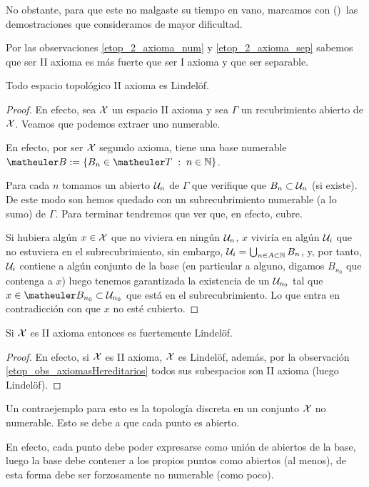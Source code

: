 No obstante, para que este no malgaste su tiempo en vano, marcamos con (\Lightning)\ las demostraciones que consideramos de mayor dificultad.
\begin{obs}
	Por las observaciones \ref{etop_2_axioma_num} y \ref{etop_2_axioma_sep} sabemos que ser II axioma es más fuerte que ser I axioma y que ser separable. 
\end{obs}
\begin{theo}
	Todo espacio topológico II axioma es Lindelöf.
\end{theo}
\begin{proof}
	En efecto, sea $\mathcal{X}$ un espacio II axioma y sea $\Gamma$ un recubrimiento abierto de $\mathcal{X}$. Veamos que podemos extraer uno numerable.
	
	En efecto, por ser $\mathcal{X}$ segundo axioma, tiene una base numerable $\B:=\{B_n\in\T\midc n\in\N\}$.
	
	Para cada $n$ tomamos un abierto $\mathcal{U}_n$ de $\Gamma$ que verifique que $B_n\subset \mathcal{U}_n$ (si existe). De este modo son hemos quedado con un subrecubrimiento numerable (a lo sumo) de $\Gamma$. Para terminar tendremos que ver que, en efecto, cubre.
	
	Si hubiera algún $x\in\mathcal{X}$ que no viviera en ningún $\mathcal{U}_n$, $x$ viviría en algún $\mathcal{U}_i$ que no estuviera en el subrecubrimiento, sin embargo, $\mathcal{U}_i=\bigcup_{n\in A\subset\mathbb{N}} B_n$, y, por tanto, $\mathcal{U}_i$ contiene a algún conjunto de la base (en particular a alguno, digamos $B_{n_0}$ que contenga a $x$) luego tenemos garantizada la existencia de un $\mathcal{U}_{n_0}$ tal que  $x\in\B_{n_0}\subset\U_{n_0}$ que está en el subrecubrimiento. Lo que entra en contradicción con que $x$ no esté cubierto.
\end{proof}
\begin{lem}
	Si $\mathcal{X}$ es II axioma entonces es fuertemente Lindelöf.
\end{lem}
\begin{proof}
	En efecto, si $\mathcal{X}$ es II axioma, $\mathcal{X}$ es Lindelöf, además, por la observación \ref{etop_obs_axiomasHereditarios} todos sus subespacios son II axioma (luego Lindelöf).
\end{proof}
\begin{obs}
	Un contraejemplo para esto es la topología discreta en un conjunto $\mathcal{X}$ no numerable. Esto se debe a que cada punto es abierto.
	
	En efecto, cada punto debe poder expresarse como unión de abiertos de la base, luego la base debe contener a los propios puntos como abiertos (al menos), de esta forma debe ser forzosamente no numerable (como poco).
\end{obs}
